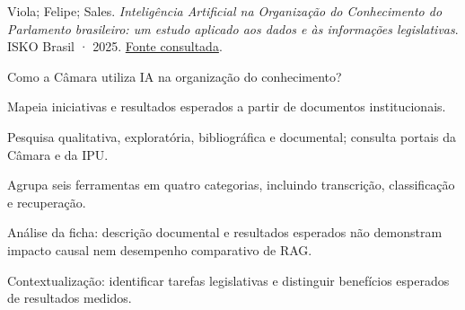 {\small Viola; Felipe; Sales. \textit{Intelig{\^e}ncia Artificial na Organiza{\c c}{\~a}o do Conhecimento do Parlamento brasileiro: um estudo aplicado aos dados e {\`a}s informa{\c c}{\~o}es legislativas}. ISKO Brasil · 2025. \href{https://isko.org.br/ojs/index.php/iskobrasil/article/download/52/54/685}{Fonte consultada}.\par}

Como a Câmara utiliza IA na organização do conhecimento?

Mapeia iniciativas e resultados esperados a partir de documentos institucionais.

Pesquisa qualitativa, exploratória, bibliográfica e documental; consulta portais da Câmara e da IPU.

Agrupa seis ferramentas em quatro categorias, incluindo transcrição, classificação e recuperação.

\begin{itemize}
\end{itemize}

Análise da ficha: descrição documental e resultados esperados não demonstram impacto causal nem desempenho comparativo de RAG.

Contextualização: identificar tarefas legislativas e distinguir benefícios esperados de resultados medidos.

